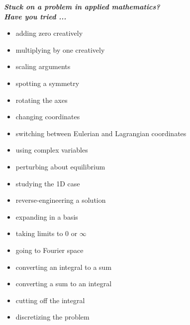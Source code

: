 \documentclass[10pt, a4paper]{article}
\begin{document}
\huge\textbf{\textit{Stuck on a problem in applied mathematics?}}\\

\Large\textbf{\textit{Have you tried ...}}\\

\begin{itemize}

\item[$+0$~~] adding zero creatively

\item[$\times1$~~] multiplying by one creatively

\item[$\sim$~~] scaling arguments

\item[$!$~~] spotting a symmetry

\item[$\circlearrowleft$~~] rotating the axes

\item[$(\xi,\eta)$~~] changing coordinates

\item[$\frac{\text{D}\textbf{u}}{\text{D}t}$] switching between Eulerian and Lagrangian coordinates

\item[$i$~~] using complex variables 

\item[$\varepsilon$~~] perturbing about equilibrium

\item[$d=1$~~] studying the 1D case

\item[\textregistered~~] reverse-engineering a solution 

\item[$x_i\textbf{e}_i$~~] expanding in a basis

\item[$\lim_{x}$~~] taking limits to 0 or $\infty$ 

\item[$(\textbf{k},\omega)$~~]  going to Fourier space

\item[$\sum$~~] converting an integral to a sum

\item[$\int$~~] converting a sum to an integral

\item[$\Lambda$~~] cutting off the integral

\item[$\Delta x$~~] discretizing the problem


\end{itemize}
\end{document}
